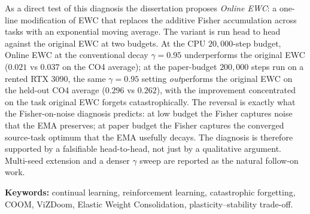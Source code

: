 As a direct test of this diagnosis the dissertation proposes
\emph{Online EWC}: a one-line modification of EWC that
replaces the additive Fisher accumulation across tasks with
an exponential moving average. The variant is run head to
head against the original EWC at two budgets. At the CPU
$20{,}000$-step budget, Online EWC at the conventional
decay $\gamma = 0.95$ underperforms the original EWC ($0.021$
vs $0.037$ on the CO4 average); at the paper-budget
$200{,}000$ steps run on a rented RTX 3090, the same
$\gamma = 0.95$ setting \emph{out}performs the original EWC
on the held-out CO4 average ($0.296$ vs $0.262$), with the
improvement concentrated on the task original EWC forgets
catastrophically. The reversal is exactly what the
Fisher-on-noise diagnosis predicts: at low budget the
Fisher captures noise that the EMA preserves; at paper
budget the Fisher captures the converged source-task
optimum that the EMA usefully decays. The diagnosis is
therefore supported by a falsifiable head-to-head, not
just by a qualitative argument. Multi-seed extension and
a denser $\gamma$ sweep are reported as the natural
follow-on work.

\medskip
\noindent\textbf{Keywords:} continual learning, reinforcement learning,
catastrophic forgetting, COOM, ViZDoom, Elastic Weight Consolidation,
plasticity--stability trade-off.
